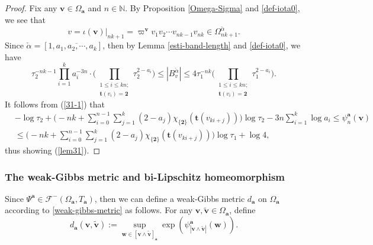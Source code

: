 \documentclass[reqno,11pt,graphicx,]{amsart}
\numberwithin{equation}{section}
\theoremstyle{plain}
\newcommand{\N}{{\mathbb N}}
\newcommand{\3}{\mathbf{3}}
\newcommand{\ma}{\mathbf{a}}
\newcommand{\mv}{\mathbf{v}}
\begin{document}
\begin{proof}
		Fix any $\mv\in\Omega_{\ma}$ and $n\in\N$. By Proposition \ref{Omega-Sigma} and \eqref{def-iota0}, we see that 
		$$v=\iota(\mv)|_{nk+1}=\varpi^{\mv}v_1v_2\cdots v_{nk-1}v_{nk}\in \Omega^{\check{\alpha}}_{nk+1}.$$ 
		Since $\check{\alpha}=[1,\overline{a_1,a_2,\cdots,a_k}]$, then by Lemma \ref{esti-band-length} and \eqref{def-iota0}, we have
		\begin{equation}
			\tau _{2}^{-nk-1}\prod_{i=1}^{k}a_{i}^{-3n}\cdot \Big(\prod_{\substack{1\leq i\leq kn;\\
					{\mathbf{t}}(v_{i})=\mathbf{2}}}\tau_{2}^{2-a_{i}}\Big)\leq |B_{v}^{\check{\alpha}}|\leq 4\tau _{1}^{-nk}\Big(
			\prod_{\substack{1\leq i\leq kn;\\
					{\mathbf{t}}(v_{i})=\mathbf{2}}}\tau _{1}^{2-a_{i}}\Big). \label{31-1}
		\end{equation}%
		It follows from (\ref{31-1}) that 
		\begin{align*}
			& -\log\tau_2+\Big( -nk+\sum\limits_{i=0}^{n-1}\sum\limits_{j=1}^{k}(2-a_{j})\chi _{\{
				\mathbf{2}\}}(\mathbf{t}(v_{ki+j}))\Big) \log \tau
			_{2}-3n\sum_{i=1}^{k}\log a_{i}\leq \psi^{\ma}_{n}(\mv) \\
			& \leq \Big( -nk+\sum\limits_{i=0}^{n-1}\sum\limits_{j=1}^{k}(2-a_{j})\chi _{\{
				\mathbf{2}\}}(\mathbf{t}(v_{ki+j}))\Big) \log \tau _{1}+\log 4,
		\end{align*}%
		thus showing (\ref{lem31}).
	\end{proof}
	\subsubsection{The weak-Gibbs metric and bi-Lipschitz homeomorphism}
	Since $\Psi^{\ma}\in\mathcal{F}^-(\Omega_{\ma},T_{\ma})$, then we can define a weak-Gibbs metric $d_{\ma}$ on $\Omega_{\ma}$ according to \eqref{weak-gibbs-metric} as follows. For any $\mv,\tilde{\mv}\in\Omega_{\ma}$, define 
	\begin{equation*}
		d_{\ma}(\mv,\tilde{\mv}):=\sup_{\mathbf{w}\in[\mv\wedge \tilde{\mv}]_{\ma}}\exp(\psi^{\ma}_{|\mv\wedge\tilde{\mv}|}(\mathbf{w})). \label{wd}
	\end{equation*}
	
\end{document}
